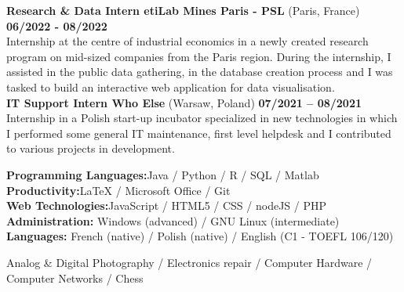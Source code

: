 \documentclass[11pt]{report}
\begin{document}
\noindent\textbf{Research \& Data Intern \textbar\space etiLab Mines Paris - PSL} (Paris, France)
\hfill
\textbf{06/2022 - 08/2022} \\
Internship at the centre of industrial economics in a newly created research program on mid-sized companies from the Paris region. During the internship, I assisted in the public data gathering, in the database
creation process and I was tasked to build an interactive web application for data visualisation.\\

\noindent\textbf{IT Support Intern \textbar\space Who Else} (Warsaw, Poland)
\hfill
\textbf{07/2021 – 08/2021} \\
Internship in a Polish start-up incubator specialized in new technologies in which I performed some general IT maintenance, first level helpdesk and I contributed to various projects in development.

	\begin{flushleft}
	 \hrulefill
	\end{flushleft}



  \noindent\textbf{Programming Languages:}\hfill{Java / Python / R / SQL / Matlab} \\
  \textbf{Productivity:}\hfill LaTeX / Microsoft Office / Git\\
  \textbf{Web Technologies:}\hfill JavaScript / HTML5 / CSS / nodeJS / PHP  \\
  \textbf{Administration:} \hfill Windows (advanced) / GNU Linux (intermediate)\\
  \textbf{Languages:} \hfill French (native) / Polish (native) / English (C1 - TOEFL 106/120) 

	\begin{flushleft}
	 \hrulefill
	\end{flushleft}

\noindent Analog \& Digital Photography / Electronics repair / Computer Hardware / Computer Networks  / Chess
\end{document}
